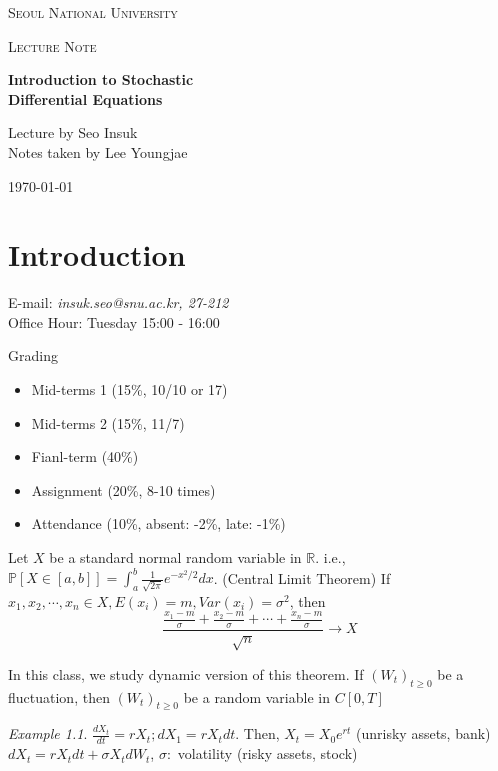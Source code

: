 \documentclass[12pt]{report}
\newcommand{\R}{\mathbb{R}}
\theoremstyle{break}
\theoremstyle{newdef}
\theoremstyle{remark}
\newtheorem*{exmp}{Example} %
\begin{document}
\begin{titlepage}
\centering
{\scshape\LARGE Seoul National University \par}
\vspace{1cm}
{\scshape\Large Lecture Note\par}
\vspace{5.5cm}
{\huge\bfseries Introduction to Stochastic \\Differential Equations\par}
\vspace{1.5cm}
\large Lecture by Seo Insuk \\
Notes taken by Lee Youngjae


\vfill
\vspace{1cm}\par
{\large \today\par}
\end{titlepage}

\setlength{\parindent}{0cm}

\tableofcontents

\setcounter{chapter}{-1}

\chapter{Introduction}
E-mail: \textit{insuk.seo@snu.ac.kr, 27-212}\\
Office Hour: Tuesday 15:00 - 16:00

Grading
\begin{itemize}
\item Mid-terms 1 (15\%, 10/10 or 17)
\item Mid-terms 2 (15\%, 11/7)
\item Fianl-term (40\%)
\item Assignment (20\%, 8-10 times)
\item Attendance (10\%, absent: -2\%, late: -1\%)
\end{itemize}


Let $X$ be a standard normal random variable in $\R$.
i.e., $\mathbb{P}[X \in [a,b]] = \int_a^b \frac{1}{\sqrt{2\pi}} e^{-x^2/2}dx$.
(Central Limit Theorem) If $x_1, x_2, \cdots, x_n \in X, E(x_i) = m, Var(x_i) = \sigma^2$, then
$$
\frac{\frac{x_1-m}{\sigma}+\frac{x_2-m}{\sigma}+\cdots+\frac{x_n-m}{\sigma}}{\sqrt n} \rightarrow X
$$

In this class, we study dynamic version of this theorem.
If $(W_t)_{t\geq 0}$ be a fluctuation, then $(W_t)_{t\geq 0}$ be a random variable in $C[0,T]$

\begin{exmp}
$\frac{dX_t}{dt} = rX_t; dX_1 = rX_tdt$. Then, $X_t = X_0 e^{rt}$ (unrisky assets, bank)\\
$dX_t = rX_tdt + \sigma X_tdW_t$, $\sigma:$ volatility (risky assets, stock)
\end{exmp}
\end{document}
